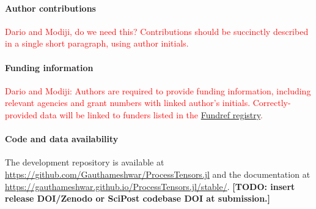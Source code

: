 \documentclass[submission, PhysCodeb]{SciPost}
\begin{document}
\paragraph{Author contributions}
\textcolor{red}{Dario and Modiji, do we need this?
Contributions should be succinctly described in a single short paragraph, using author initials.}

\paragraph{Funding information}
\textcolor{red}{Dario and Modiji: Authors are required to provide funding information, including relevant agencies and grant numbers with linked author's initials.
Correctly-provided data will be linked to funders listed in the \href{https://www.crossref.org/services/funder-registry/}{\sf Fundref registry}.}

\paragraph{Code and data availability}
The development repository is available at \url{https://github.com/Gauthameshwar/ProcessTensors.jl} and the documentation at \url{https://gauthameshwar.github.io/ProcessTensors.jl/stable/}.
\textbf{[TODO: insert release DOI/Zenodo or SciPost codebase DOI at submission.]}





\begin{appendix}







\end{appendix}
\end{document}
